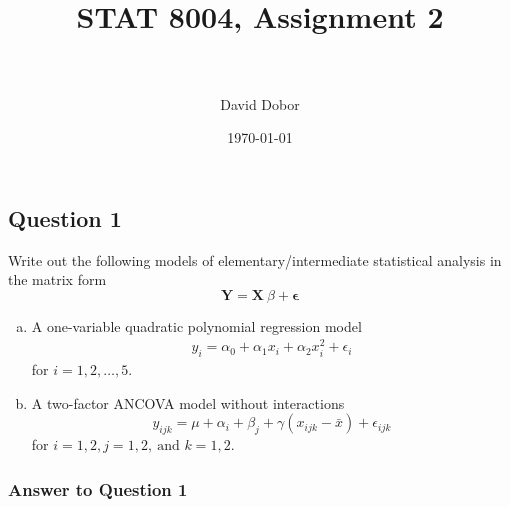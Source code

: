 \documentclass[paper=a4, fontsize=11pt]{scrartcl} %
\title{	
\normalfont \normalsize 
\horrule{0.5pt} \\[0.4cm] %
\huge STAT 8004, Assignment 2 \\ %
\horrule{2pt} \\[0.5cm] %
}
\author{David Dobor}
\date{\normalsize\today} %
\newcommand{\matX}{\mathbf{X}}
\newcommand{\matY}{\mathbf{Y}}
\begin{document}
\maketitle 



\subsection*{Question 1}
Write out the following models of elementary/intermediate statistical analysis in the matrix form
$$
\matY = \matX \  \beta + \mathbf{\epsilon}
$$
\begin{enumerate}[(a)]
\item A one-variable quadratic polynomial regression model
\begin{align*}
y_i = \alpha_0 + \alpha_1 x_i + \alpha_2 x_i^2 + \epsilon_i
\end{align*}
for $i = 1, 2, \ldots , 5$.
\item A two-factor ANCOVA model without interactions
$$
y_{ijk} = \mu + \alpha_i + \beta_j + \gamma (x_{ijk} - \bar x) + \epsilon_{i j k}
$$
for $i = 1, 2, j = 1, 2, \ \text{and } k = 1, 2.$
\end{enumerate}

\bigskip
\subsubsection*{Answer to Question 1}
\end{document}
